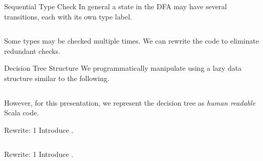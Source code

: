 \begin{frame}{Sequential Type Check}
  In general a state in the DFA may have several transitions, each with its own type label.
  \begin{columns}
    \begin{column}{0.5\textwidth}
      \usebox\typecaseAbox
    \end{column}
    \begin{column}{0.5\textwidth}  %
      \scalebox{0.9}{}
    \end{column}    
  \end{columns}

  Some types may be checked multiple times.  We can rewrite the code to eliminate redundant checks.
\end{frame}

\begin{frame}{Decision Tree Structure}
  We programmatically manipulate  using a lazy data structure similar to the following.

  \begin{columns}
    \begin{column}{0.5\textwidth}
      \usebox\typecaseAbox
    \end{column}
    \begin{column}{0.5\textwidth}  %
      \usebox\typecaseITEbox
    \end{column}    
  \end{columns}

  However, for this presentation, we represent the decision tree as \emph{human readable} Scala code.
\end{frame}



\begin{frame}{Rewrite: 1}
  Introduce .

  \begin{columns}
    \begin{column}{0.5\textwidth}
      \usebox\typecaseAbox
    \end{column}
    \begin{column}{0.5\textwidth}  %
      \usebox\typecaseBabox
    \end{column}    
  \end{columns}
\end{frame}

\begin{frame}{Rewrite: 1}
  Introduce .

  \begin{columns}
    \begin{column}{0.5\textwidth}
      \usebox\typecaseAbox
    \end{column}
    \begin{column}{0.5\textwidth}  %
      \usebox\typecaseBbox
    \end{column}    
  \end{columns}
\end{frame}



